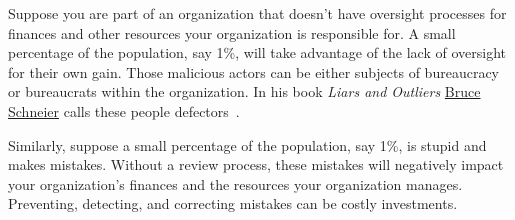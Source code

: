 Suppose  you are part of an organization that doesn't have oversight processes for finances and other resources your organization is responsible for. A small percentage of the population, say 1\%, will take advantage of the lack of oversight for their own gain. Those malicious actors can be either subjects of bureaucracy or bureaucrats within the organization. 
In his book \textit{Liars and Outliers} \href{https://en.wikipedia.org/wiki/Bruce_Schneier}{Bruce Schneier}
\iftoggle{WPinmargin}{\marginpar{$>$Wikipedia: Bruce Schneier}}{}
calls these people defectors~\cite{2012_Schneier}.

Similarly, suppose a small percentage of the population, say 1\%, is stupid and makes mistakes. Without a review process, these mistakes will negatively impact your organization's finances and the resources your organization manages. Preventing, detecting, and correcting mistakes can be costly investments. 



